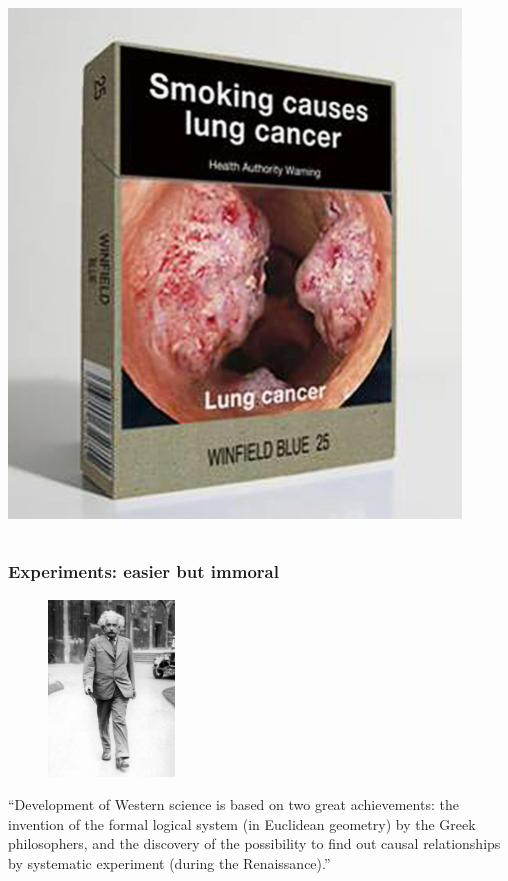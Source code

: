 \documentclass[handout]{beamer}
\begin{document}
\begin{frame}
\begin{columns}
\begin{column}{0.48\textwidth}
			\includegraphics[width=0.9\textwidth]{../figures/cigarette_late.jpeg}
		\end{column}
	\end{columns}
	
\end{frame}

\begin{frame}
	\frametitle{Experiments: easier but immoral}
	
	\begin{figure}[ht]
		\centerline{\includegraphics[width=0.3\textwidth]{../figures/einstein_oxford.jpeg}}
	\end{figure}
	
	``Development of Western science is based on two great achievements: the invention of the formal logical system (in Euclidean geometry) by the Greek philosophers, and the discovery of the possibility to find out causal relationships by systematic experiment (during the Renaissance).''
	
\end{frame}
\end{document}
